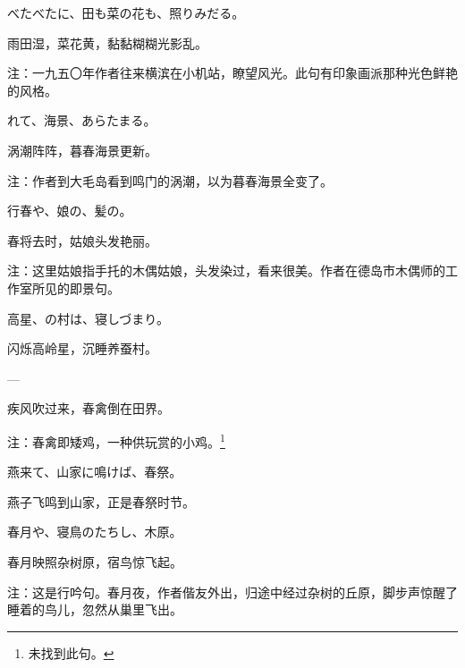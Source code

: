\begin{haiku}
    {\FH べたべたに、田も菜の花も、照りみだる。}

    {\FK 雨田湿，菜花黄，黏黏糊糊光影乱。}

    {\FT 注：一九五〇年作者往来横滨在小机站，瞭望风光。此句有印象画派那种光色鲜艳的风格。}
\end{haiku}

\begin{haiku}
    {\FH {}れて、海景、あらたまる。}

    {\FK 涡潮阵阵，暮春海景更新。}

    {\FT 注：作者到大毛岛看到鸣门的涡潮，以为暮春海景全变了。}
\end{haiku}

\begin{haiku}
    {\FH 行春や、娘の、髪の。}

    {\FK 春将去时，姑娘头发艳丽。}

    {\FT 注：这里姑娘指手托的木偶姑娘，头发染过，看来很美。作者在德岛市木偶师的工作室所见的即景句。}
\end{haiku}

\begin{haiku}
    {\FH 高星、の村は、寝しづまり。}

    {\FK 闪烁高岭星，沉睡养蚕村。}
\end{haiku}

\begin{haiku}
    {\FH ---}

    {\FK 疾风吹过来，春禽倒在田界。}

    {\FT 注：春禽即矮鸡，一种供玩赏的小鸡。\footnote{\FT 未找到此句。}}
\end{haiku}

\begin{haiku}
    {\FH 燕来て、山家に鳴けば、春祭。}

    {\FK 燕子飞鸣到山家，正是春祭时节。}
\end{haiku}

\begin{haiku}
    {\FH 春月や、寝鳥のたちし、木原。}

    {\FK 春月映照杂树原，宿鸟惊飞起。}

    {\FT 注：这是行吟句。春月夜，作者偕友外出，归途中经过杂树的丘原，脚步声惊醒了睡着的鸟儿，忽然从巢里飞出。}
\end{haiku}

